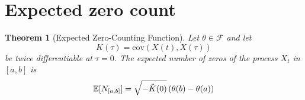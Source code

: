 \documentclass{article}
\newtheorem{theorem}{Theorem}
\begin{document}
\section{Expected zero count}\label{sec:zero_count}

\begin{theorem}[Expected Zero-Counting Function]
  \label{thm:zero_count}Let $\theta \in \mathcal{F}$ and let
  \begin{equation}
    K (\tau) = \mathrm{cov} (X (t), X (\tau))
  \end{equation}
  be twice differentiable at $\tau = 0$. The expected number of zeros of the
  process $X_t$ in $[a, b]$ is
  \begin{equation}
    \label{eq:zero_count} \mathbb{E} [N_{[a, b]}] = \sqrt{- \ddot{K} (0)} 
    \hspace{0.17em} (\theta (b) - \theta (a))
  \end{equation}
\end{theorem}
\end{document}
